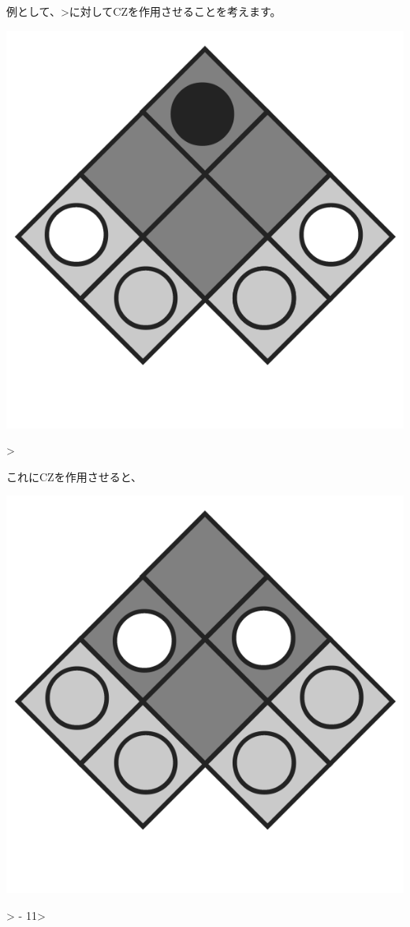 例として、\textbar{}{-}{-}\textgreater{}に対してCZを作用させることを考えます。

\begin{reviewimage}
\includegraphics[width=0.5\maxwidth]{./images/image6.png}
\caption{\textbar{}{-}{-}\textgreater{}}
\label{image:01:image6}
\end{reviewimage}

これにCZを作用させると、

\begin{reviewimage}
\includegraphics[width=0.5\maxwidth]{./images/image7.png}
\caption{\textbar{}{-}{-}\textgreater{} {-} \textbar{}11\textgreater{}}
\label{image:01:image7}
\end{reviewimage}

